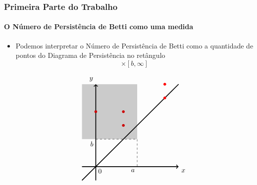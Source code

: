 \documentclass[11pt]{beamer}
\theoremstyle{remark}
\theoremstyle{definition}
\theoremstyle{plain}
\begin{document}
    \begin{frame}
        \frametitle{Primeira Parte do Trabalho}
        \framesubtitle{O  Número de Persistência de Betti como uma medida}

        \begin{itemize}
            \item
                Podemos interpretar o Número de Persistência de Betti
                como a quantidade de pontos do Diagrama de Persistência
                no retângulo
                \begin{equation*}
                    [-\infty, a] \times [b, \infty]
                \end{equation*}

                \[
                    \begin{tikzpicture}[scale=0.7]
                        \draw[very thick, ->] (-1,0) --  (6,0) node[below right] {$x$};
                        \draw[very thick, ->] (-0,-1) -- (0,6) node[above left ] {$y$};
                        \draw (0,0) node[below right] {$0$};

                        \draw[-, very thick] (-1,-1) -- (6,6);

                        \fill[red] (2,3) circle (0.1cm);
                        \fill[red] (2,4) circle (0.1cm);
                        \fill[red] (0,4) circle (0.1cm);
                        \fill[red] (5,6) circle (0.1cm);
                        \fill[red] (5,5) circle (0.1cm);

                        \fill[opacity=0.2] (-1,2) rectangle (3,6);
                        \draw[dashed] (0,2) node[below left] {$b$} 
                            -- (3,2) -- (3,0) node[below left] {$a$};
                    \end{tikzpicture}
                \]
        \end{itemize}
    \end{frame}
\end{document}
